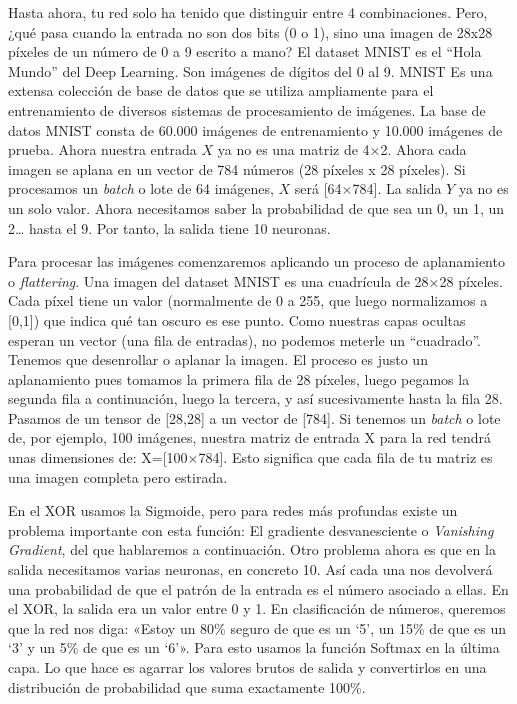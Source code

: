 \documentclass[a4paper,11pt]{article}
\begin{document}
Hasta ahora, tu red solo ha tenido que distinguir entre 4 combinaciones.
Pero, ¿qué pasa cuando la entrada no son dos bits (0 o 1), sino una
imagen de 28x28 píxeles de un número de 0 a 9 escrito a mano? El dataset
MNIST es el ``Hola Mundo'' del Deep Learning. Son imágenes de dígitos
del 0 al 9. MNIST Es una extensa colección de base de datos que se
utiliza ampliamente para el entrenamiento de diversos sistemas de
procesamiento de imágenes. La base de datos MNIST consta de 60.000
imágenes de entrenamiento y 10.000 imágenes de prueba. Ahora nuestra
entrada \(X\) ya no es una matriz de 4×2. Ahora cada imagen se aplana en
un vector de 784 números (28 píxeles x 28 píxeles). Si procesamos un
\emph{batch} o lote de 64 imágenes, \(X\) será {[}64×784{]}. La salida
\(Y\) ya no es un solo valor. Ahora necesitamos saber la probabilidad de
que sea un 0, un 1, un 2\ldots{} hasta el 9. Por tanto, la salida tiene
10 neuronas.

Para procesar las imágenes comenzaremos aplicando un proceso de
aplanamiento o \emph{flattering}. Una imagen del dataset MNIST es una
cuadrícula de 28×28 píxeles. Cada píxel tiene un valor (normalmente de 0
a 255, que luego normalizamos a {[}0,1{]}) que indica qué tan oscuro es
ese punto. Como nuestras capas ocultas esperan un vector (una fila de
entradas), no podemos meterle un ``cuadrado''. Tenemos que desenrollar o
aplanar la imagen. El proceso es justo un aplanamiento pues tomamos la
primera fila de 28 píxeles, luego pegamos la segunda fila a
continuación, luego la tercera, y así sucesivamente hasta la fila 28.
Pasamos de un tensor de {[}28,28{]} a un vector de {[}784{]}. Si tenemos
un \emph{batch} o lote de, por ejemplo, 100 imágenes, nuestra matriz de
entrada X para la red tendrá unas dimensiones de: X={[}100×784{]}. Esto
significa que cada fila de tu matriz es una imagen completa pero
estirada.

En el XOR usamos la Sigmoide, pero para redes más profundas existe un
problema importante con esta función: El gradiente desvanesciente o
\emph{Vanishing Gradient}, del que hablaremos a continuación. Otro
problema ahora es que en la salida necesitamos varias neuronas, en
concreto 10. Así cada una nos devolverá una probabilidad de que el
patrón de la entrada es el número asociado a ellas. En el XOR, la salida
era un valor entre 0 y 1. En clasificación de números, queremos que la
red nos diga: «Estoy un 80\% seguro de que es un `5', un 15\% de que es
un `3' y un 5\% de que es un `6'». Para esto usamos la función Softmax
en la última capa. Lo que hace es agarrar los valores brutos de salida y
convertirlos en una distribución de probabilidad que suma exactamente
100\%.
\end{document}
